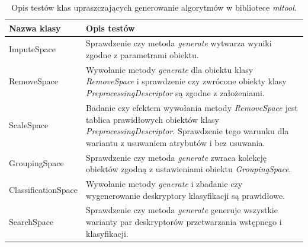 \documentclass[../thesis.tex]{subfiles}
\begin{document}
\begin{table}[h]
\begin{center}
\begin{tabular}{ | l | p{110mm} | }
\hline
\rowcolor{lightgray} Nazwa klasy & Opis testów \\\hline

ImputeSpace & Sprawdzenie czy metoda \emph{generate} wytwarza wyniki zgodne z parametrami obiektu.\\\hline
RemoveSpace & Wywołanie metody \emph{generate} dla obiektu klasy \emph{RemoveSpace} i sprawdzenie czy zwrócone obiekty klasy \emph{PreprocessingDescriptor} są zgodne z założeniami.\\\hline
ScaleSpace & Badanie czy efektem wywołania metody \emph{RemoveSpace} jest tablica prawidłowych obiektów klasy \emph{PreprocessingDescriptor}. Sprawdzenie tego warunku dla wariantu z usuwaniem atrybutów i bez usuwania. \\\hline
GroupingSpace & Sprawdzenie czy metoda \emph{generate} zwraca kolekcję obiektów zgodną z ustawieniami obiektu \emph{GroupingSpace}.\\\hline
ClassificationSpace & Wywołanie metody \emph{generate} i zbadanie czy wygenerowanie deskryptory klasyfikacji są prawidłowe.\\\hline
SearchSpace & Sprawdzenie czy metoda \emph{generate} generuje wszystkie warianty par deskryptorów przetwarzania wstępnego i klasyfikacji.\\\hline

\end{tabular}
\caption{Opis testów klas upraszczających generowanie algorytmów w bibliotece \emph{mltool}.}
\label{proj:table_mltool_spaces}
\end{center}
\end{table}
\end{document}
